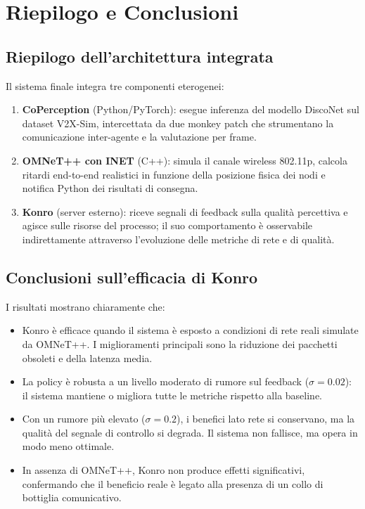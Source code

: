 \documentclass[12pt,a4paper]{article}
\begin{document}
\section{Riepilogo e Conclusioni}

\subsection{Riepilogo dell'architettura integrata}

Il sistema finale integra tre componenti eterogenei:

\begin{enumerate}
  \item \textbf{CoPerception} (Python/PyTorch): esegue inferenza del modello DiscoNet
        sul dataset V2X-Sim, intercettata da due monkey patch che strumentano la
        comunicazione inter-agente e la valutazione per frame.

  \item \textbf{OMNeT++ con INET} (C++): simula il canale wireless 802.11p, calcola
        ritardi end-to-end realistici in funzione della posizione fisica dei nodi
        e notifica Python dei risultati di consegna.

  \item \textbf{Konro} (server esterno): riceve segnali di feedback sulla qualit\`a
        percettiva e agisce sulle risorse del processo; il suo comportamento \`e
        osservabile indirettamente attraverso l'evoluzione delle metriche di rete
        e di qualit\`a.
\end{enumerate}

\subsection{Conclusioni sull'efficacia di Konro}

I risultati mostrano chiaramente che:

\begin{itemize}
  \item Konro \`e efficace quando il sistema \`e esposto a condizioni di rete reali
        simulate da OMNeT++. I miglioramenti principali sono la riduzione dei
        pacchetti obsoleti e della latenza media.

  \item La policy \`e robusta a un livello moderato di rumore sul feedback
        ($\sigma = 0.02$): il sistema mantiene o migliora tutte le metriche rispetto
        alla baseline.

  \item Con un rumore pi\`u elevato ($\sigma = 0.2$), i benefici lato rete si
        conservano, ma la qualit\`a del segnale di controllo si degrada. Il sistema
        non fallisce, ma opera in modo meno ottimale.

  \item In assenza di OMNeT++, Konro non produce effetti significativi, confermando
        che il beneficio reale \`e legato alla presenza di un collo di bottiglia
        comunicativo.
\end{itemize}
\end{document}
